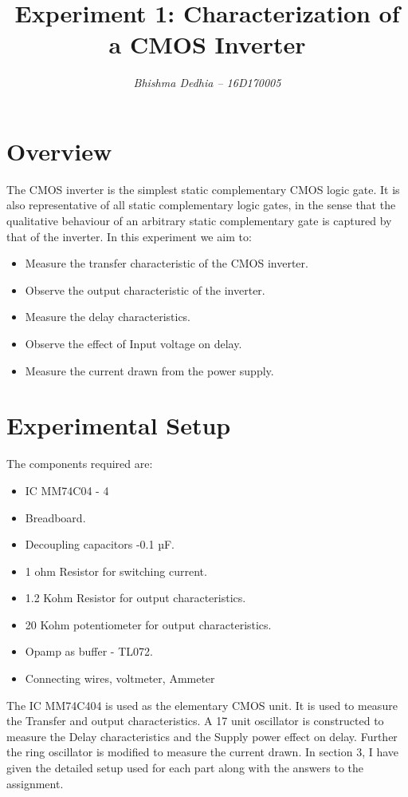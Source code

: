 \documentclass[12pt]{article}
\title{\textbf{Experiment 1: Characterization of a CMOS Inverter}}
\author{\textit{Bhishma Dedhia -- 16D170005}}
\begin{document}
\maketitle

\section{Overview}

The CMOS inverter is the simplest static complementary CMOS logic gate.
It is also representative of all static complementary logic gates, in the sense
that the qualitative behaviour of an arbitrary static complementary gate is
captured by that of the inverter. In this experiment we aim to:
\begin{itemize}
\item Measure the transfer characteristic of the CMOS inverter.
\item Observe the output characteristic of the inverter.
\item Measure the delay characteristics.
\item Observe the effect of Input voltage on delay.
\item Measure the current drawn from the power supply.
\end{itemize}

\section{Experimental Setup}
The components required are:
\begin{itemize}
\item IC MM74C04 - 4
\item Breadboard.
\item Decoupling capacitors -0.1 µF.
\item 1 ohm Resistor for switching current.
\item 1.2 Kohm Resistor for output characteristics.
\item 20 Kohm potentiometer for output characteristics.
\item Opamp as buffer - TL072.
\item Connecting wires, voltmeter, Ammeter
\end{itemize}
The IC MM74C404 is used as the elementary CMOS unit. It is used to measure the Transfer and output characteristics. A 17 unit oscillator is constructed to measure the Delay characteristics and the Supply power effect on delay. Further the ring oscillator is modified to measure the current drawn. In section 3, I have given the detailed setup used for each part along with the answers to the assignment.  
\end{document}
